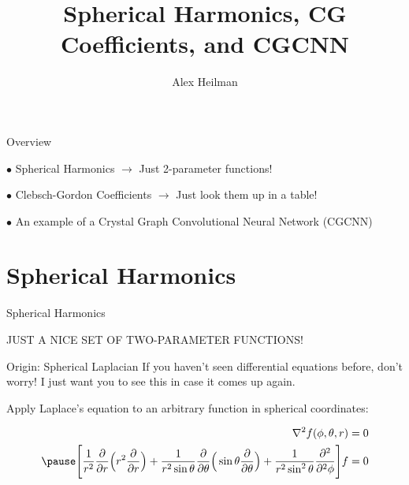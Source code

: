 \documentclass[handout, 11pt]{beamer}
\author{Alex Heilman}
\title{Spherical Harmonics, CG Coefficients, and CGCNN}
\begin{document}
\begin{frame}
\titlepage
\end{frame}


\begin{frame}{Overview}

$\bullet$ Spherical Harmonics \pause $\rightarrow$ Just 2-parameter functions!\pause

\vspace{1cm}

$\bullet$ Clebsch-Gordon Coefficients \pause $\rightarrow$ Just look them up in a table! \pause

\vspace{1cm}

$\bullet$ An example of a Crystal Graph Convolutional Neural Network (CGCNN)

\end{frame}

\section{Spherical Harmonics}
\begin{frame}{Spherical Harmonics}
\begin{center}
JUST A NICE SET OF TWO-PARAMETER FUNCTIONS!
\end{center}
\end{frame}

\begin{frame}{Origin: Spherical Laplacian}
If you haven't seen differential equations before, don't worry! I just want you to see this in case it comes up again.

\pause

\begin{center}
Apply Laplace's equation to an arbitrary function in spherical coordinates:

\begin{align*}
\nabla^2 f(\phi,\theta,r) & = 0\\ \pause
\Bigg[
\frac{1}{r^2}\frac{\partial}{\partial r}\Big(r^2\frac{\partial}{\partial r}\Big)+\frac{1}{r^2\sin\theta}\frac{\partial}{\partial \theta}\Big(\sin\theta\frac{\partial}{\partial \theta}\Big)+\frac{1}{r^2\sin^2\theta}\frac{\partial^2}{\partial^2 \phi}\Bigg]f&=0\\
\end{align*}
\end{center}
\end{frame}
\end{document}
